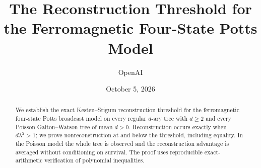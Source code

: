 \documentclass[11pt]{article}
\title{The Reconstruction Threshold for the\newline
  Ferromagnetic Four-State Potts Model}
\author{OpenAI}
\date{October 5, 2026}
\theoremstyle{definition}
\theoremstyle{remark}
\numberwithin{equation}{section}
\begin{document}
\maketitle
\begin{abstract}
We establish the exact Kesten--Stigum reconstruction threshold for the
ferromagnetic four-state Potts broadcast model on every regular $d$-ary
tree with $d\ge2$ and every Poisson Galton--Watson tree of mean $d>0$.
Reconstruction occurs exactly when $d\lambda^2>1$; we prove
nonreconstruction at and below the threshold, including equality.
In the Poisson model the whole tree is observed and the reconstruction
advantage is averaged without conditioning on survival. The proof uses
reproducible exact-arithmetic verification of polynomial inequalities.
\end{abstract}







\appendix

\end{document}
